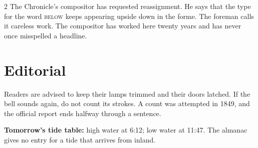 \begin{multicols}{2}
The Chronicle's compositor has requested reassignment. He says that the
type for the word \textsc{below} keeps appearing upside down in the forme.
The foreman calls it careless work. The compositor has worked here twenty
years and has never once misspelled a headline.

\section*{Editorial}
Readers are advised to keep their lamps trimmed and their doors latched. If
the bell sounds again, do not count its strokes. A count was attempted in
1849, and the official report ends halfway through a sentence.

\textbf{Tomorrow's tide table:} high water at 6:12; low water at 11:47.
The almanac gives no entry for a tide that arrives from inland.
\end{multicols}
